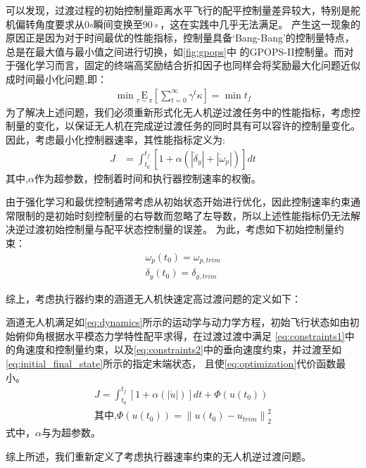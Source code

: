 可以发现，过渡过程的初始控制量距离水平飞行的配平控制量差异较大，特别是舵机偏转角度要求从0$\circ$瞬间变换至$90\circ$，这在实践中几乎无法满足。
产生这一现象的原因正是因为对于时间最优的性能指标，控制量具备‘Bang-Bang’的控制量特点，总是在最大值与最小值之间进行切换，如\autoref{fig:gpops}中
的GPOPS-II控制量。而对于强化学习而言，固定的终端高奖励结合折扣因子也同样会将奖励最大化问题近似成时间最小化问题,即：
\begin{align}
    \min  \underset{\tau \sim \pi }{\mathrm{E}}\left[\sum_{t=0}^{\infty} \gamma^{t}\kappa\right]=\min t_{f}
\end{align}
为了解决上述问题，我们必须重新形式化无人机逆过渡任务中的性能指标，考虑控制量的变化，以保证无人机在完成逆过渡任务的同时具有可以容许的控制量变化。
因此，考虑最小化控制器速率，其性能指标定义为:
\begin{align}
    J & = \int_{t_{0}}^{t_{f}}\left[1+\alpha (\left |\dot \delta_{y} \right |+\left |\dot \omega_{p} \right |)\right] d t
\end{align}
其中,$\alpha$作为超参数，控制着时间和执行器控制速率的权衡。

由于强化学习和最优控制通常考虑从初始状态开始进行优化，因此控制速率约束通常限制的是初始时刻控制量的右导数而忽略了左导数，所以上述性能指标仍无法解决逆过渡初始控制量与配平状态控制量的误差。
为此，考虑如下初始控制量约束：
\begin{align}
    \omega_{p}(t_{0}) = \omega_{p,trim} \\
    \delta_{y}(t_{0}) = \delta_{y,trim}
\end{align}

综上，考虑执行器约束的涵道无人机快速定高过渡问题的定义如下：

涵道无人机满足如\autoref{eq:dynamics}所示的运动学与动力学方程，初始飞行状态如由初始俯仰角根据水平模态力学特性配平求得，在过渡过渡中满足
\autoref{eq:constraints1}中的角速度和控制量约束，以及\autoref{eq:constraints2}中的垂向速度约束，并过渡至如\autoref{eq:initial_final_state}所示的指定末端状态，
且使\autoref{eq:optimization}代价函数最小。
\begin{align}
    \label{eq:optimization}
    J = \int_{t_{0}}^{t_{f}}\left [ 1+\alpha (\left|\dot{u}\right| ) \right ]dt +\Phi (u(t_{0}))\\
\textbf{其中,} \Phi (u(t_{0}))=\left \| u(t_{0})-u_{trim} \right \|_{2}^{2} 
\end{align}
式中，$\alpha$与为超参数。

综上所述，我们重新定义了考虑执行器速率约束的无人机逆过渡问题。
